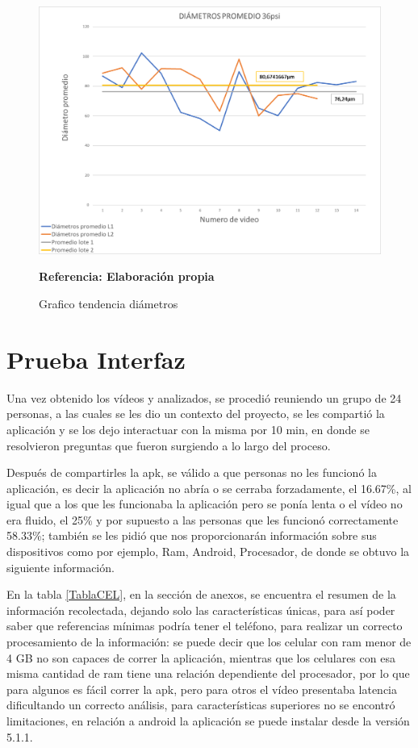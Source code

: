 \documentclass[12pt,twocolumn,a4paper]{article}
\begin{document}
\begin{figure}[h!]
	\centering
	\includegraphics[scale=0.3]{Diapro36.png}
	\caption{Grafico tendencia diámetros } \textbf{Referencia: Elaboración propia} 
	\label{Diapro36}
\end{figure}

\section{Prueba Interfaz}

Una vez obtenido los vídeos y analizados, se procedió reuniendo un grupo de 24 personas, a las cuales se les dio un contexto del proyecto, se les compartió la aplicación y se los dejo interactuar con la misma por 10 min, en donde se resolvieron preguntas que fueron surgiendo a lo largo del proceso.

Después de compartirles la apk, se válido a que personas no les funcionó la aplicación, es decir  la aplicación no abría o se cerraba forzadamente, el 16.67\%, al igual que a los que les funcionaba la aplicación pero se ponía lenta o el vídeo no era fluido, el 25\% y por supuesto a las personas que les funcionó correctamente 58.33\%; también se les pidió que nos proporcionarán información sobre sus dispositivos como por ejemplo, Ram, Android, Procesador, de donde se obtuvo la siguiente información.



En la tabla \ref{TablaCEL}, en la sección de anexos, se  encuentra el resumen de la información recolectada, dejando solo las características únicas, para así poder saber  que referencias mínimas podría tener el teléfono, para realizar un correcto procesamiento de la información: se puede decir que los celular con ram menor de 4 GB no son capaces de correr la aplicación, mientras que los celulares con esa misma cantidad de ram tiene una relación dependiente del procesador, por lo que para algunos es fácil correr la apk, pero para otros el vídeo presentaba latencia dificultando un correcto análisis, para características superiores no se encontró limitaciones, en relación a android la aplicación se puede instalar desde la versión 5.1.1.
\end{document}
